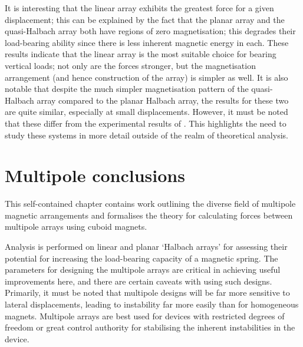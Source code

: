\documentclass[11pt,a4paper]{memoir}
\begin{document}
It is interesting that the linear array exhibits the greatest force for a given displacement; this can be explained by the fact that the planar array and the quasi-Halbach array both have regions of zero magnetisation; this degrades their load-bearing ability since there is less inherent magnetic energy in each.
These results indicate that the linear array is the most suitable choice for bearing vertical loads; not only are the forces stronger, but the magnetisation arrangement (and hence construction of the array) is simpler as well.
It is also notable that despite the much simpler magnetisation pattern of the quasi-Halbach array compared to the planar Halbach array, the results for these two are quite similar, especially at small displacements.
However, it must be noted that these differ from the experimental results of \textcite{moser2002-maglev}.
This highlights the need to study these systems in more detail outside of the realm of theoretical analysis.

\begin{figure}[htbp!]
\centering
{}
\end{figure}

\section{Multipole conclusions}

This self-contained chapter contains work outlining the diverse field of multipole magnetic arrangements and formalises the theory for calculating forces between multipole arrays using cuboid magnets.

Analysis is performed on linear and planar `Halbach arrays' for assessing their potential for increasing the load-bearing capacity of a magnetic spring.
The parameters for designing the multipole arrays are critical in achieving useful improvements here, and there are certain caveats with using such designs.
Primarily, it must be noted that multipole designs will be far more sensitive to lateral displacements, leading to instability far more easily than for homogeneous magnets.
Multipole arrays are best used for devices with restricted degrees of freedom or great control authority for stabilising the inherent instabilities in the device.
\end{document}
